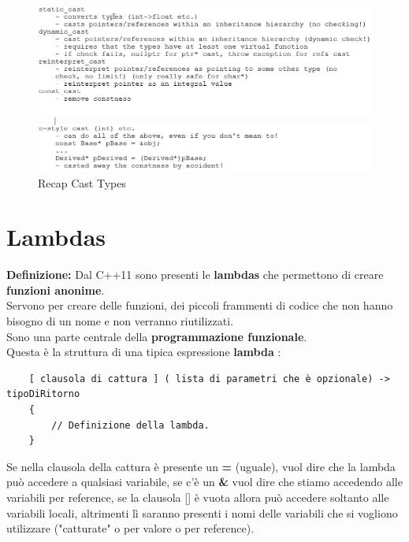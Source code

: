 \begin{figure}[ht]
	\centering
	\includegraphics[width=1\textwidth, height=1\textheight, keepaspectratio]{./imgs/cast_types_recap_static_dynamic_reinterpret_const_c-style2.png}
	\caption{Recap Cast Types}
	\label{fig:cast_types_recap_static_dynamic_reinterpret_const_c-style2}
\end{figure}



\section{Lambdas}

\textsf{\small \textbf{Definizione:} Dal C++11 sono presenti le \textbf{lambdas} che permettono di creare \textbf{funzioni anonime}.} \\

\textsf{\small Servono per creare delle funzioni, dei piccoli frammenti di codice che non hanno bisogno di un nome e non verranno riutilizzati. } \\ %

\textsf{\small Sono una parte centrale della \textbf{programmazione funzionale}.} \\

\textsf{\small Questa è la struttura di una tipica espressione \textbf{lambda} :} \\

\begin{lstlisting}
	[ clausola di cattura ] ( lista di parametri che è opzionale) -> tipoDiRitorno
	{
		// Definizione della lambda.
	}
\end{lstlisting}

\textsf{\small Se nella clausola della cattura è presente un \textbf{=} (uguale), vuol dire che la lambda può accedere a qualsiasi variabile, se c'è un \textbf{\&} vuol dire che stiamo accedendo alle variabili per reference, se la clausola [] è vuota allora può accedere soltanto alle variabili locali, altrimenti lì saranno presenti i nomi delle variabili che si vogliono utilizzare ("catturate" o per valore o per reference).} \\ %

